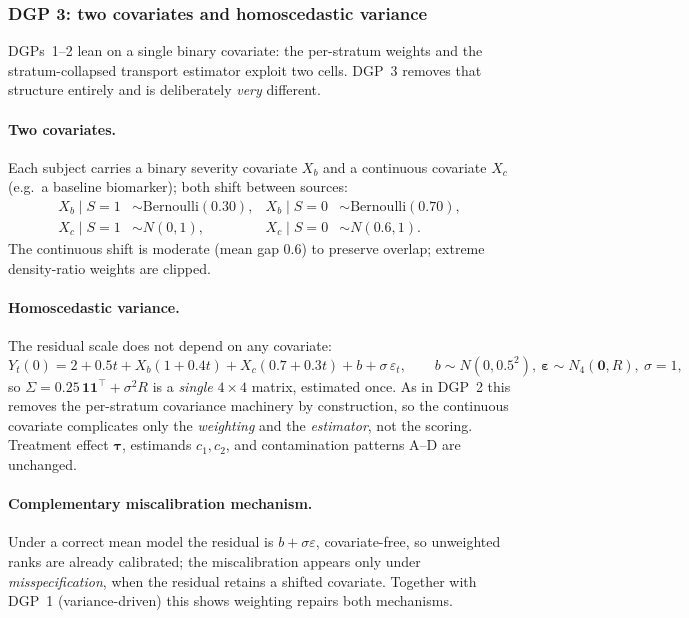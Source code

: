 \documentclass[11pt]{article}
\begin{document}
\subsubsection{DGP 3: two covariates and homoscedastic variance}\label{sec:dgp2}

DGPs~1--2 lean on a single binary covariate: the per-stratum weights and the stratum-collapsed transport estimator exploit two cells. DGP~3 removes that structure entirely and is deliberately \emph{very} different.

\paragraph{Two covariates.} Each subject carries a binary severity covariate $X_b$ and a continuous covariate $X_c$ (e.g.\ a baseline biomarker); both shift between sources:
\[
\begin{aligned}
X_b\mid S{=}1&\sim\mathrm{Bernoulli}(0.30),
&X_b\mid S{=}0&\sim\mathrm{Bernoulli}(0.70),\\
X_c\mid S{=}1&\sim N(0,1),
&X_c\mid S{=}0&\sim N(0.6,1).
\end{aligned}
\]
The continuous shift is moderate (mean gap $0.6$) to preserve overlap; extreme density-ratio weights are clipped.

\paragraph{Homoscedastic variance.} The residual scale does not depend on any covariate:
\[
Y_t(0)=2+0.5t+X_b(1+0.4t)+X_c(0.7+0.3t)+b+\sigma\,\varepsilon_t,
\qquad
b\sim N(0,0.5^2),\ \bm\varepsilon\sim N_4(\bm 0,R),\ \sigma=1,
\]
so $\Sigma=0.25\,\bm 1\bm 1^{\top}+\sigma^2 R$ is a \emph{single} $4\times4$ matrix, estimated once. As in DGP~2 this removes the per-stratum covariance machinery by construction, so the continuous covariate complicates only the \emph{weighting} and the \emph{estimator}, not the scoring. Treatment effect $\bm\tau$, estimands $c_1,c_2$, and contamination patterns A--D are unchanged.

\paragraph{Complementary miscalibration mechanism.} Under a correct mean model the residual is $b+\sigma\varepsilon$, covariate-free, so unweighted ranks are already calibrated; the miscalibration appears only under \emph{misspecification}, when the residual retains a shifted covariate. Together with DGP~1 (variance-driven) this shows weighting repairs both mechanisms.
\end{document}
